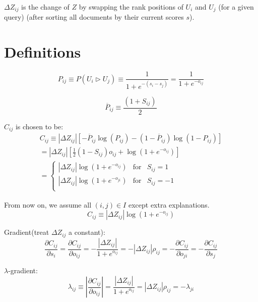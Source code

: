 \documentclass [11pt,a4paper]{article}
\begin{document}
$\Delta Z_{ij}$ is the change of $Z$ by swapping the rank positions of $U_i$ and $U_j$
(for a given query)
(after sorting all documents by their current scores $s$).


\section{Definitions}
\begin{equation}
P_{ij} \equiv P(U_i \rhd U_j) \equiv \frac{1}{1 + e^{-(s_i - s_j)}}
= \frac{1}{1 + e^{-o_{ij}}}
\end{equation}


\begin{equation}
\overline{P}_{ij} \equiv \frac{(1 + S_{ij})}{2}
\end{equation}


$C_{ij}$ is chosen to be:
\begin{eqnarray}
C_{ij} \equiv |\Delta Z_{ij}| \left[
  -\overline{P}_{ij}\log(P_{ij}) - (1-\overline{P}_{ij})\log(1-P_{ij})
\right] \\
= |\Delta Z_{ij}| \left[
  \frac{1}{2}(1-S_{ij})o_{ij} + \log(1+e^{-o_{ij}})
\right] \\
= \left\{
  \begin{array}{rcl}
    |\Delta Z_{ij}| \log(1+e^{-o_{ij}}) & \mbox{for} & S_{ij}=1\\
    |\Delta Z_{ij}| \log(1+e^{-o_{ji}}) & \mbox{for} & S_{ij}=-1\\
  \end{array}
\right.
\end{eqnarray}


From now on, we assume all $(i,j) \in I$ except extra explanations.
\begin{equation}
C_{ij} \equiv |\Delta Z_{ij}| \log(1+e^{-o_{ij}})
\end{equation}


Gradient(treat $\Delta Z_{ij}$ a constant):
\begin{equation}
\frac{\partial C_{ij}}{\partial s_i}
= \frac{\partial C_{ij}}{\partial o_{ij}}
= - \frac{|\Delta Z_{ij}|}{1+e^{o_{ij}}}
= - |\Delta Z_{ij}| \rho_{ij}
= -\frac{\partial C_{ij}}{\partial o_{ji}}
= - \frac{\partial C_{ij}}{\partial s_j}
\end{equation}


$\lambda$-gradient:
\begin{equation}
\lambda_{ij}
\equiv \left| \frac{\partial C_{ij}}{\partial o_{ij}} \right|
= \frac{|\Delta Z_{ij}|}{1+e^{o_{ij}}}
= |\Delta Z_{ij}| \rho_{ij}
= -\lambda_{ji}
\end{equation}
\end{document}
